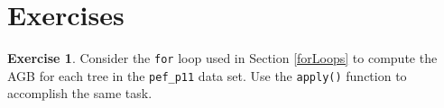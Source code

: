 \documentclass[
  11pt,
]{krantz}
\theoremstyle{definition}
\theoremstyle{definition}
\theoremstyle{definition}
\newtheorem{exercise}{Exercise}[chapter]
\theoremstyle{definition}
\theoremstyle{remark}
\begin{document}
\hypertarget{exercisesFunctions}{%
\section{Exercises}\label{exercisesFunctions}}

\begin{exercise}
\protect\hypertarget{exr:functions1}{}\label{exr:functions1}Consider the \texttt{for} loop used in Section \ref{forLoops} to compute the AGB for each tree in the \texttt{pef\_p11} data set. Use the \texttt{apply()} function to accomplish the same task.
\end{exercise}

  

\printindex
\end{document}
